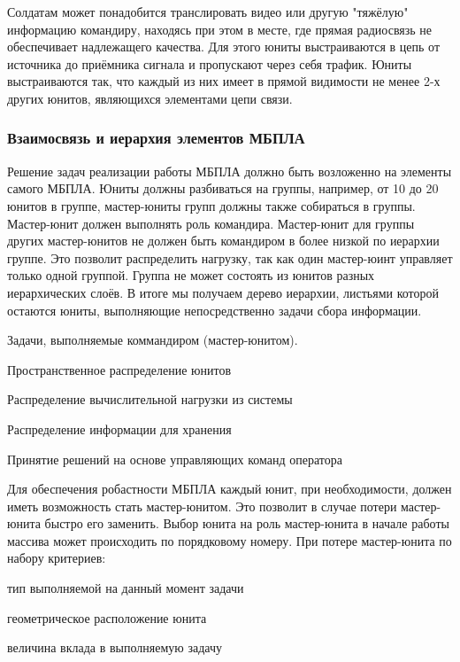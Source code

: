 Солдатам может понадобится транслировать видео или другую
"тяжёлую" информацию командиру, находясь при этом в месте,
где прямая радиосвязь не обеспечивает надлежащего качества.
Для этого юниты выстраиваются в цепь от источника до приёмника
сигнала и пропускают через себя трафик. Юниты выстраиваются так,
что каждый из них имеет в прямой видимости не менее 2-х других
юнитов, являющихся элементами цепи связи.

\subsubsection{Взаимосвязь и иерархия элементов МБПЛА}

Решение задач реализации работы МБПЛА должно быть возложенно на элементы
самого МБПЛА. Юниты должны разбиваться на группы, например,
от 10 до 20 юнитов в группе, мастер-юниты групп должны также собираться
в группы. Мастер-юнит должен выполнять роль командира. Мастер-юнит для
группы других мастер-юнитов не должен быть командиром в более низкой по
иерархии группе. Это позволит распределить нагрузку, так как один мастер-юинт
управляет только одной группой. Группа не может состоять из юнитов разных
иерархических слоёв. В итоге мы получаем дерево иерархии, листьями которой
остаются юниты, выполняющие непосредственно задачи сбора информации.

Задачи, выполняемые коммандиром (мастер-юнитом).

\begin{mintemize}
\item Пространственное распределение юнитов
\item Распределение вычислительной нагрузки из системы
\item Распределение информации для хранения
\item Принятие решений на основе управляющих команд оператора
\end{mintemize}

Для обеспечения робастности МБПЛА каждый юнит, при необходимости, должен
иметь возможность стать мастер-юнитом. Это позволит в случае потери
мастер-юнита быстро его заменить. Выбор юнита на роль мастер-юнита в начале
работы массива может происходить по порядковому номеру. При потере
мастер-юнита по набору критериев:

\begin{mintemize}
\item тип выполняемой на данный момент задачи
\item геометрическое расположение юнита
\item величина вклада в выполняемую задачу
\end{mintemize}

